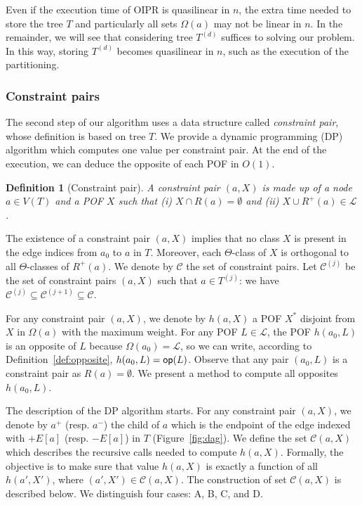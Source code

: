 \documentclass{article}
\newtheorem{definition}{Definition}
\newcommand{\opp}{\mbox{\textsf{op}}}
\begin{document}
Even if the execution time of OIPR is quasilinear in $n$, the extra time needed to store the tree $T$ and particularly all sets $\Omega(a)$ may not be linear in $n$. In the remainder, we will see that considering tree $T^{(d)}$ suffices to solving our problem. In this way, storing $T^{(d)}$ becomes quasilinear in $n$, such as the execution of the partitioning.

\subsubsection{Constraint pairs} \label{subsubsec:cp}

The second step of our algorithm uses a data structure called \textit{constraint pair}, whose definition is based on tree $T$. We provide a dynamic programming (DP) algorithm which computes one value per constraint pair. At the end of the execution, we can deduce the opposite of each POF in $O(1)$.

\begin{definition}[Constraint pair]
A constraint pair $(a,X)$ is made up of a node $a \in V(T)$ and a POF $X$ such that {\em (i)} $X \cap R(a) = \emptyset$ and {\em (ii)} $X \cup R^+(a) \in \mathcal{L}$.
\label{def:cp}
\end{definition}

The existence of a constraint pair $(a,X)$ implies that no class $X$ is present in the edge indices from $a_0$ to $a$ in $T$. Moreover, each $\Theta$-class of $X$ is orthogonal to all $\Theta$-classes of $R^+(a)$. We denote by $\mathcal{C}$ the set of constraint pairs. Let $\mathcal{C}^{(j)}$ be the set of constraint pairs $(a,X)$ such that $a\in T^{(j)}$: we have $\mathcal{C}^{(j)} \subseteq \mathcal{C}^{(j+1)} \subseteq \mathcal{C}$.

For any constraint pair $(a,X)$, we denote by $h(a,X)$ a POF $X^*$ disjoint from $X$ in $\Omega(a)$ with the maximum weight. For any POF $L \in \mathcal{L}$, the POF $h(a_0,L)$ is an opposite of $L$ because $\Omega(a_0) = \mathcal{L}$, so we can write, according to Definition~\ref{def:opposite}, $h(a_0,L) = \opp(L)$. Observe that any pair $(a_0,L)$ is a constraint pair as $R(a) = \emptyset$. We present a method to compute all opposites $h(a_0,L)$.

The description of the DP algorithm starts. For any constraint pair $(a,X)$, we denote by $a^+$ (resp. $a^-$) the child of $a$ which is the endpoint of the edge indexed with $+E\left[a\right]$ (resp. $-E\left[a\right]$) in $T$ (Figure~\ref{fig:dag}). 
We define the set $\mathcal{C}(a,X)$ which describes the recursive calls needed to compute $h(a,X)$. Formally, the objective is to make sure that value $h(a,X)$ is exactly a function of all $h(a',X')$, where $(a',X') \in \mathcal{C}(a,X)$.
The construction of set $\mathcal{C}(a,X)$ is described below. We distinguish four cases: A, B, C, and D.
\end{document}
